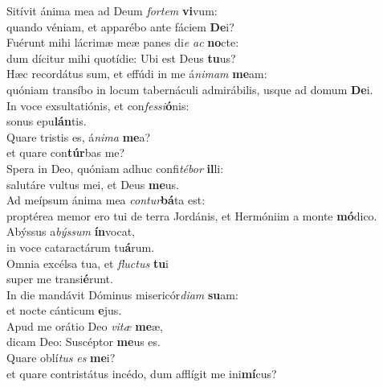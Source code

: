 \evenverse Sitívit ánima mea ad Deum \textit{for}\textit{tem} \textbf{vi}vum:~\*\\
\evenverse quando véniam, et apparébo ante fáciem \textbf{De}i?\\
\oddverse Fuérunt mihi lácrimæ meæ panes di\textit{e} \textit{ac} \textbf{no}cte:~\*\\
\oddverse dum dícitur mihi quotídie: Ubi est Deus \textbf{tu}us?\\
\evenverse Hæc recordátus sum, et effúdi in me á\textit{ni}\textit{mam} \textbf{me}am:~\*\\
\evenverse quóniam transíbo in locum tabernáculi admirábilis, usque ad domum \textbf{De}i.\\
\oddverse In voce exsultatiónis, et con\textit{fes}\textit{si}\textbf{ó}nis:~\*\\
\oddverse sonus epu\textbf{lán}tis.\\
\evenverse Quare tristis es, á\textit{ni}\textit{ma} \textbf{me}a?~\*\\
\evenverse et quare con\textbf{túr}bas me?\\
\oddverse Spera in Deo, quóniam adhuc confi\textit{té}\textit{bor} \textbf{il}li:~\*\\
\oddverse salutáre vultus mei, et Deus \textbf{me}us.\\
\evenverse Ad meípsum ánima mea \textit{con}\textit{tur}\textbf{bá}ta est:~\*\\
\evenverse proptérea memor ero tui de terra Jordánis, et Hermóniim a monte \textbf{mó}dico.\\
\oddverse Abýssus a\textit{býs}\textit{sum} \textbf{ín}vocat,~\*\\
\oddverse in voce cataractárum tu\textbf{á}rum.\\
\evenverse Omnia excélsa tua, et \textit{flu}\textit{ctus} \textbf{tu}i~\*\\
\evenverse super me transi\textbf{é}runt.\\
\oddverse In die mandávit Dóminus misericór\textit{di}\textit{am} \textbf{su}am:~\*\\
\oddverse et nocte cánticum \textbf{e}jus.\\
\evenverse Apud me orátio Deo \textit{vi}\textit{tæ} \textbf{me}æ,~\*\\
\evenverse dicam Deo: Suscéptor \textbf{me}us es.\\
\oddverse Quare oblí\textit{tus} \textit{es} \textbf{me}i?~\*\\
\oddverse et quare contristátus incédo, dum afflígit me ini\textbf{mí}cus?\\
